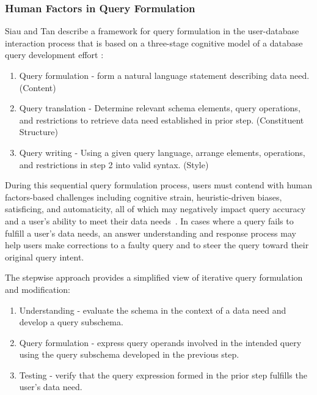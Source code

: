 \subsubsection{Human Factors in Query Formulation} Siau and Tan describe a framework for query formulation in the user-database interaction process that is based on a three-stage cognitive model of a database query development effort \cite{1637793}:

\begin{enumerate}
  \item Query formulation - form a natural language statement describing data need. (Content)
  \item Query translation - Determine relevant schema elements, query operations, and restrictions to retrieve data need established in prior step. (Constituent Structure)
  \item Query writing - Using a given query language, arrange elements, operations, and restrictions in step 2 into valid syntax. (Style)
\end{enumerate}


During this sequential query formulation process, users must contend with human factors-based challenges including cognitive strain, heuristic-driven biases, satisficing, and automaticity, all of which may negatively impact query accuracy and a user's ability to meet their data needs~\cite{1637793}. 
In cases where a query fails to fulfill a user's data needs, an answer understanding and response process may help users make corrections to a faulty query and to steer the query toward their original query intent.

The stepwise approach \cite{10.5555/647248.719775} provides a simplified view of iterative query formulation and modification:

\begin{enumerate}
  \item Understanding - evaluate the schema in the context of a data need and develop a query subschema.
  \item Query formulation - express query operands involved in the intended query using the query subschema developed in the previous step.
  \item Testing - verify that the query expression formed in the prior step fulfills the user's data need.
\end{enumerate}

